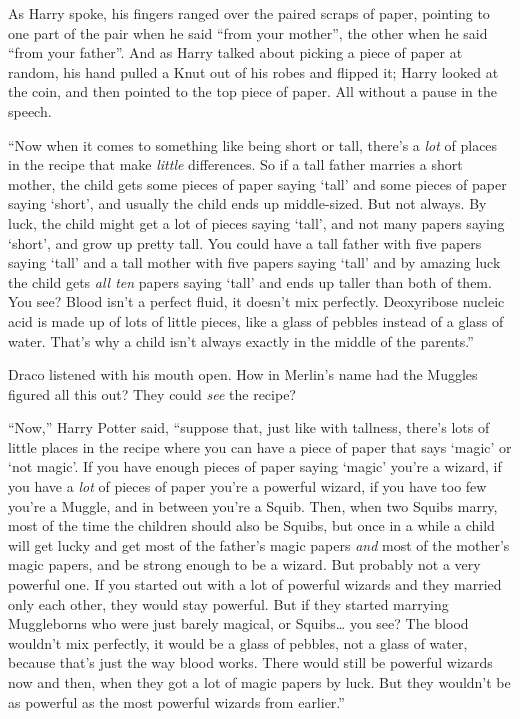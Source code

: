 As Harry spoke, his fingers ranged over the paired scraps of paper,
pointing to one part of the pair when he said ``from your mother'', the
other when he said ``from your father''. And as Harry talked about
picking a piece of paper at random, his hand pulled a Knut out of his
robes and flipped it; Harry looked at the coin, and then pointed to the
top piece of paper. All without a pause in the speech.

``Now when it comes to something like being short or tall, there's a
\emph{lot} of places in the recipe that make \emph{little} differences.
So if a tall father marries a short mother, the child gets some pieces
of paper saying `tall' and some pieces of paper saying `short', and
usually the child ends up middle-sized. But not always. By luck, the
child might get a lot of pieces saying `tall', and not many papers
saying `short', and grow up pretty tall. You could have a tall father
with five papers saying `tall' and a tall mother with five papers saying
`tall' and by amazing luck the child gets \emph{all ten} papers saying
`tall' and ends up taller than both of them. You see? Blood isn't a
perfect fluid, it doesn't mix perfectly. Deoxyribose nucleic acid is
made up of lots of little pieces, like a glass of pebbles instead of a
glass of water. That's why a child isn't always exactly in the middle of
the parents.''

Draco listened with his mouth open. How in Merlin's name had the Muggles
figured all this out? They could \emph{see} the recipe?

``Now,'' Harry Potter said, ``suppose that, just like with tallness,
there's lots of little places in the recipe where you can have a piece
of paper that says `magic' or `not magic'. If you have enough pieces of
paper saying `magic' you're a wizard, if you have a \emph{lot} of pieces
of paper you're a powerful wizard, if you have too few you're a Muggle,
and in between you're a Squib. Then, when two Squibs marry, most of the
time the children should also be Squibs, but once in a while a child
will get lucky and get most of the father's magic papers \emph{and} most
of the mother's magic papers, and be strong enough to be a wizard. But
probably not a very powerful one. If you started out with a lot of
powerful wizards and they married only each other, they would stay
powerful. But if they started marrying Muggleborns who were just barely
magical, or Squibs\ldots{} you see? The blood wouldn't mix perfectly, it
would be a glass of pebbles, not a glass of water, because that's just
the way blood works. There would still be powerful wizards now and then,
when they got a lot of magic papers by luck. But they wouldn't be as
powerful as the most powerful wizards from earlier.''

